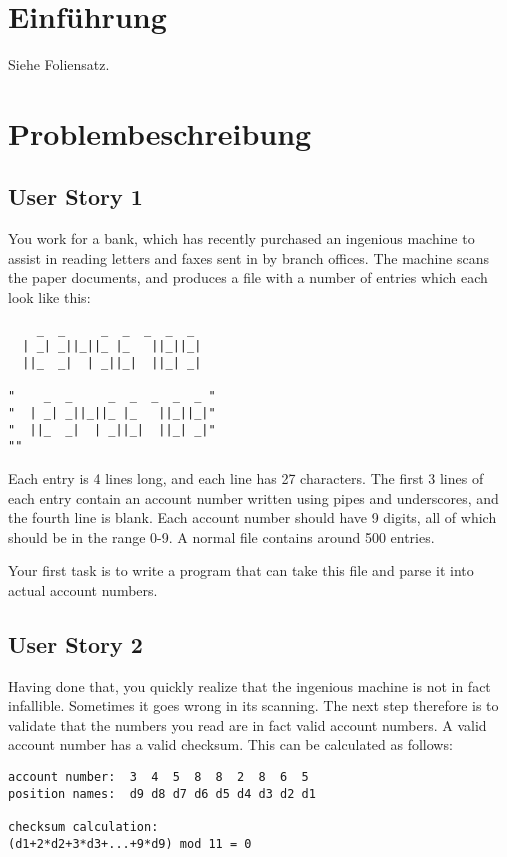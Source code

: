 \section{Einführung}
Siehe Foliensatz.

\pagebreak

\section{Problembeschreibung}

\subsection{User Story 1}

You work for a bank, which has recently purchased an ingenious machine to assist in reading letters and faxes sent in by branch offices. The machine scans the paper documents, and produces a file with a number of entries which each look like this:

\begin{lstlisting}
    _  _     _  _  _  _  _ 
  | _| _||_||_ |_   ||_||_|
  ||_  _|  | _||_|  ||_| _|

"    _  _     _  _  _  _  _ "
"  | _| _||_||_ |_   ||_||_|"
"  ||_  _|  | _||_|  ||_| _|"
""
\end{lstlisting}
Each entry is 4 lines long, and each line has 27 characters. The first 3 lines of each entry contain an account number written using pipes and underscores, and the fourth line is blank. Each account number should have 9 digits, all of which should be in the range 0-9. A normal file contains around 500 entries.

Your first task is to write a program that can take this file and parse it into actual account numbers.

\subsection{User Story 2}

Having done that, you quickly realize that the ingenious machine is not in fact infallible. Sometimes it goes wrong in its scanning. The next step therefore is to validate that the numbers you read are in fact valid account numbers. A valid account number has a valid checksum. This can be calculated as follows:

\begin{lstlisting}
account number:  3  4  5  8  8  2  8  6  5
position names:  d9 d8 d7 d6 d5 d4 d3 d2 d1

checksum calculation:
(d1+2*d2+3*d3+...+9*d9) mod 11 = 0
\end{lstlisting}

